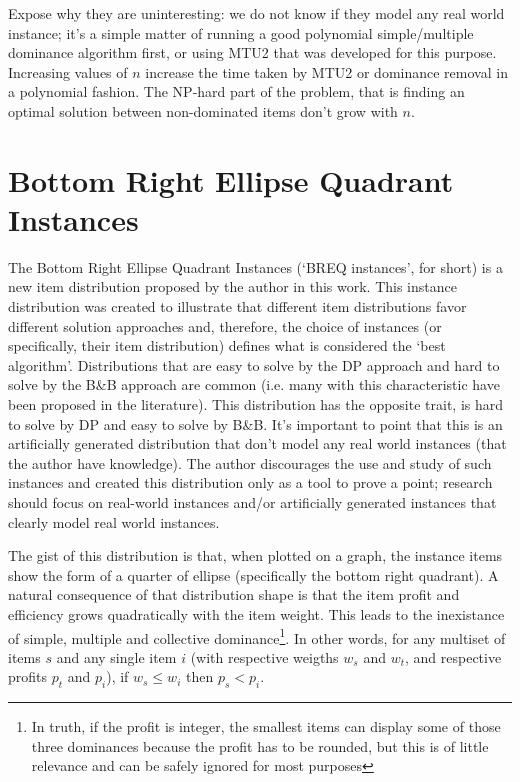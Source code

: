 Expose why they are uninteresting: we do not know if they model any real world instance; it's a simple matter of running a good polynomial simple/multiple dominance algorithm first, or using MTU2 that was developed for this purpose. Increasing values of \(n\) increase the time taken by MTU2 or dominance removal in a polynomial fashion. The NP-hard part of the problem, that is finding an optimal solution between non-dominated items don't grow with \(n\). %

\section{Bottom Right Ellipse Quadrant Instances}

The Bottom Right Ellipse Quadrant Instances (`BREQ instances', for short) is a new item distribution proposed by the author in this work. This instance distribution was created to illustrate that different item distributions favor different solution approaches and, therefore, the choice of instances (or specifically, their item distribution) defines what is considered the `best algorithm'. Distributions that are easy to solve by the DP approach and hard to solve by the B\&B approach are common (i.e. many with this characteristic have been proposed in the literature). This distribution has the opposite trait, is hard to solve by DP and easy to solve by B\&B. It's important to point that this is an artificially generated distribution that don't model any real world instances (that the author have knowledge). The author discourages the use and study of such instances and created this distribution only as a tool to prove a point; research should focus on real-world instances and/or artificially generated instances that clearly model real world instances.

The gist of this distribution is that, when plotted on a graph, the instance items show the form of a quarter of ellipse (specifically the bottom right quadrant). A natural consequence of that distribution shape is that the item profit and efficiency grows quadratically with the item weight. This leads to the inexistance of simple, multiple and collective dominance\footnote{In truth, if the profit is integer, the smallest items can display some of those three dominances because the profit has to be rounded, but this is of little relevance and can be safely ignored for most purposes}. In other words, for any multiset of items \(s\) and any single item \(i\) (with respective weigths \(w_s\) and \(w_t\), and respective profits \(p_t\) and \(p_i\)), if \(w_s \leq w_i\) then \(p_s < p_i\).

